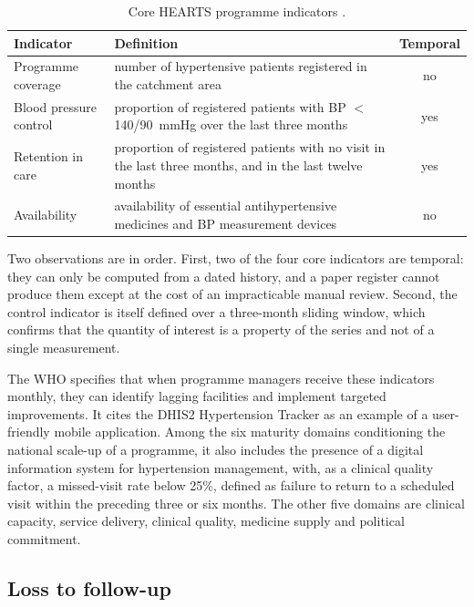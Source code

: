 \documentclass[12pt,a4paper,oneside]{report}
\begin{document}
\begin{table}[htbp]
\centering\small
\caption{Core HEARTS programme indicators \parencite{who2023hypertension}.}\label{tab:hearts}
\begin{tabularx}{\textwidth}{@{}>{\raggedright\arraybackslash}p{3.6cm} X c@{}}
\toprule
\textbf{Indicator} & \textbf{Definition} & \textbf{Temporal} \\
\midrule
Programme coverage & number of hypertensive patients registered in the catchment area & no \\
Blood pressure control & proportion of registered patients with BP $<$ 140/90~mmHg over the last three months & yes \\
Retention in care & proportion of registered patients with no visit in the last three months, and in the last twelve months & yes \\
Availability & availability of essential antihypertensive medicines and BP measurement devices & no \\
\bottomrule
\end{tabularx}
\end{table}

Two observations are in order. First, two of the four core indicators are temporal: they can only be computed from a dated history, and a paper register cannot produce them except at the cost of an impracticable manual review. Second, the control indicator is itself defined over a three-month sliding window, which confirms that the quantity of interest is a property of the series and not of a single measurement.

The WHO specifies that when programme managers receive these indicators monthly, they can identify lagging facilities and implement targeted improvements. It cites the DHIS2 Hypertension Tracker as an example of a user-friendly mobile application. Among the six maturity domains conditioning the national scale-up of a programme, it also includes the presence of a digital information system for hypertension management, with, as a clinical quality factor, a missed-visit rate below 25\%, defined as failure to return to a scheduled visit within the preceding three or six months. The other five domains are clinical capacity, service delivery, clinical quality, medicine supply and political commitment.

\subsection{Loss to follow-up}\label{sec:ltfu}
\end{document}
